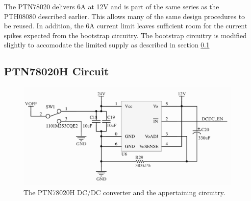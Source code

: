 The PTN78020 delivers 6A at 12V and is part of the same series as the PTH08080 described earlier.
This allows many of the same design procedures to be reused.
In addition, the 6A current limit leaves sufficient room for the current spikes expected from the bootstrap circuitry.
The bootstrap circuitry is modified slightly to accomodate the limited supply as described in section \ref{}


\subsection{PTN78020H Circuit}

\begin{figure}
	\centering
	\includegraphics[width=\linewidth]{graphics/dcdc12v}
	\caption{The PTN78020H DC/DC converter and the appertaining circuitry.}
	\label{fig:dcdc12v}
\end{figure}

